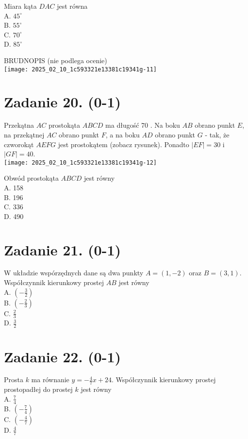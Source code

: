 \documentclass[10pt]{article}
\begin{document}
Miara kąta \(D A C\) jest równa\\
A. \(45^{\circ}\)\\
B. \(55^{\circ}\)\\
C. \(70^{\circ}\)\\
D. \(85^{\circ}\)

BRUDNOPIS (nie podlega ocenie)\\
\texttt{[image: 2025\_02\_10\_1c593321e13381c19341g-11]}

\section*{Zadanie 20. (0-1)}
Przekątna \(A C\) prostokąta \(A B C D\) ma długość 70 . Na boku \(A B\) obrano punkt \(E\), na przekątnej \(A C\) obrano punkt \(F\), a na boku \(A D\) obrano punkt \(G\) - tak, że czworokąt \(A E F G\) jest prostokątem (zobacz rysunek). Ponadto \(|E F|=30\) i \(|G F|=40\).\\
\texttt{[image: 2025\_02\_10\_1c593321e13381c19341g-12]}

Obwód prostokąta \(A B C D\) jest równy\\
A. 158\\
B. 196\\
C. 336\\
D. 490

\section*{Zadanie 21. (0-1)}
W układzie wspórzędnych dane są dwa punkty \(A=(1,-2)\) oraz \(B=(3,1)\). Współczynnik kierunkowy prostej \(A B\) jest równy\\
A. \(\left(-\frac{3}{2}\right)\)\\
B. \(\left(-\frac{2}{3}\right)\)\\
C. \(\frac{2}{3}\)\\
D. \(\frac{3}{2}\)

\section*{Zadanie 22. (0-1)}
Prosta \(k\) ma równanie \(y=-\frac{4}{7} x+24\). Współczynnik kierunkowy prostej prostopadłej do prostej \(k\) jest równy\\
A. \(\frac{7}{4}\)\\
B. \(\left(-\frac{7}{4}\right)\)\\
C. \(\left(-\frac{4}{7}\right)\)\\
D. \(\frac{4}{7}\)
\end{document}
